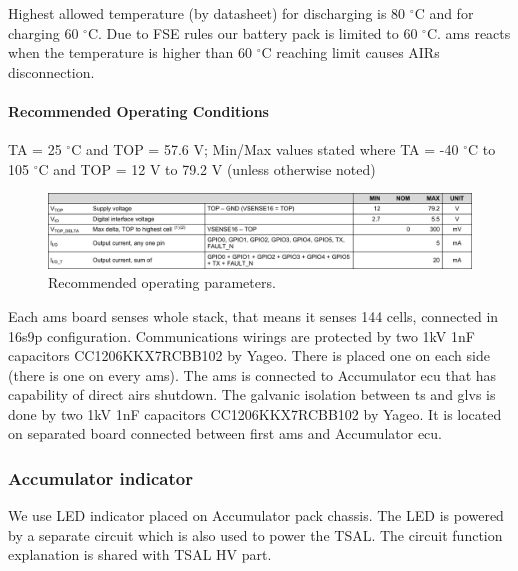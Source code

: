 Highest allowed temperature (by datasheet) for discharging is 80 $^\circ$C and for charging 60 $^\circ$C. Due to FSE rules our battery pack is limited to 60 $^\circ$C. \gls{ams} reacts when the temperature is higher than 60 $^\circ$C reaching limit causes AIRs disconnection.

\paragraph{Recommended Operating Conditions}
TA = 25 $^\circ$C and TOP = 57.6 V; Min/Max values stated where TA = -40 $^\circ$C to 105 $^\circ$C and TOP = 12 V to 79.2 V (unless otherwise noted)
\begin{figure}[H]
	\centering
	\includegraphics[width=\textwidth]{./img/BMS-operatingparms.pdf}
	\caption{Recommended operating parameters.}
	\label{fig:BMS-op-params}
\end{figure}


Each \gls{ams} board senses whole stack, that means it senses 144 cells, connected in 16s9p configuration. Communications wirings are protected by two 1kV 1nF capacitors CC1206KKX7RCBB102 by Yageo. There is placed one on each side (there is one on every \gls{ams}). The \gls{ams} is connected to Accumulator \gls{ecu} that has capability of direct \glspl{air} shutdown. The galvanic isolation between \gls{ts} and \gls{glvs} is done by two 1kV 1nF capacitors CC1206KKX7RCBB102 by Yageo. It is located on separated board connected between first \gls{ams} and Accumulator \gls{ecu}.




\subsubsection{Accumulator indicator}

We use LED indicator placed on Accumulator pack chassis. The LED is powered by a separate circuit which is also used to power the TSAL. The circuit function explanation is shared with TSAL HV part. 

